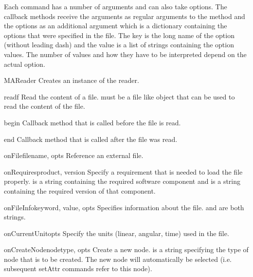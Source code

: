 Each command has a number of arguments and can also take options. The
callback methods receive the arguments as regular arguments to the
method and the options as an additional argument  which is
a dictionary containing the options that were specified in the
file. The key is the long name of the option (without leading dash)
and the value is a list of strings containing the option values.  The
number of values and how they have to be interpreted depend on the
actual option.

\begin{classdesc}{MAReader}{}
  Creates an instance of the reader.
\end{classdesc}

\begin{methoddesc}{read}{f}
Read the content of a file.  must be a file like object that
can be used to read the content of the file.
\end{methoddesc}

\begin{methoddesc}{begin}{}
Callback method that is called before the file is read.
\end{methoddesc}

\begin{methoddesc}{end}{}
Callback method that is called after the file was read.
\end{methoddesc}

\begin{methoddesc}{onFile}{filename, opts}
Reference an external file.
\end{methoddesc}

\begin{methoddesc}{onRequires}{product, version}
Specify a requirement that is needed to load the file properly.
 is a string containing the required software component
and  is a string containing the required version of that
component.
\end{methoddesc}

\begin{methoddesc}{onFileInfo}{keyword, value, opts}
Specifies information about the file.  and 
are both strings.
\end{methoddesc}

\begin{methoddesc}{onCurrentUnit}{opts}
Specify the units (linear, angular, time) used in the file.
\end{methoddesc}

\begin{methoddesc}{onCreateNode}{nodetype, opts}
Create a new node.  is a string specifying the type of node
that is to be created. The new node will automatically be selected (i.e.
subsequent setAttr commands refer to this node).
\end{methoddesc}

